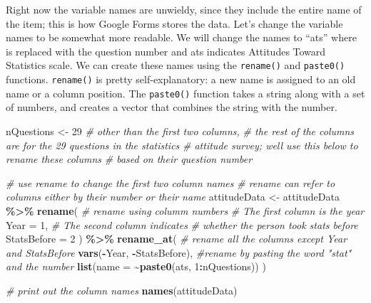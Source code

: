 \documentclass[
  12pt,
]{book}
\newenvironment{Shaded}{\begin{snugshade}}{\end{snugshade}}
\newcommand{\AttributeTok}[1]{\textcolor[rgb]{0.13,0.29,0.53}{#1}}
\newcommand{\CommentTok}[1]{\textcolor[rgb]{0.56,0.35,0.01}{\textit{#1}}}
\newcommand{\DecValTok}[1]{\textcolor[rgb]{0.00,0.00,0.81}{#1}}
\newcommand{\FunctionTok}[1]{\textcolor[rgb]{0.13,0.29,0.53}{\textbf{#1}}}
\newcommand{\NormalTok}[1]{#1}
\newcommand{\OtherTok}[1]{\textcolor[rgb]{0.56,0.35,0.01}{#1}}
\newcommand{\SpecialCharTok}[1]{\textcolor[rgb]{0.81,0.36,0.00}{\textbf{#1}}}
\newcommand{\StringTok}[1]{\textcolor[rgb]{0.31,0.60,0.02}{#1}}
\begin{document}
Right now the variable names are unwieldy, since they include the entire name of the item; this is how Google Forms stores the data. Let's change the variable names to be somewhat more readable. We will change the names to ``ats'' where is replaced with the question number and ats indicates Attitudes Toward Statistics scale. We can create these names using the \texttt{rename()} and \texttt{paste0()} functions. \texttt{rename()} is pretty self-explanatory: a new name is assigned to an old name or a column position. The \texttt{paste0()} function takes a string along with a set of numbers, and creates a vector that combines the string with the number.

\begin{Shaded}
\begin{Highlighting}[]
\NormalTok{nQuestions }\OtherTok{\textless{}{-}} \DecValTok{29} \CommentTok{\# other than the first two columns, }
\CommentTok{\# the rest of the columns are for the 29 questions in the statistics}
\CommentTok{\# attitude survey; we\textquotesingle{}ll use this below to rename these columns }
\CommentTok{\# based on their question number}

\CommentTok{\# use rename to change the first two column names}
\CommentTok{\# rename can refer to columns either by their number or their name}
\NormalTok{attitudeData }\OtherTok{\textless{}{-}}
\NormalTok{  attitudeData }\SpecialCharTok{\%\textgreater{}\%} 
  \FunctionTok{rename}\NormalTok{(     }\CommentTok{\# rename using columm numbers}
    \CommentTok{\# The first column is the year }
    \AttributeTok{Year =} \DecValTok{1}\NormalTok{, }
    \CommentTok{\# The second column indicates }
    \CommentTok{\# whether the person took stats before}
    \AttributeTok{StatsBefore =} \DecValTok{2} 
\NormalTok{  ) }\SpecialCharTok{\%\textgreater{}\%} 
  \FunctionTok{rename\_at}\NormalTok{( }
    \CommentTok{\# rename all the columns except Year and StatsBefore}
    \FunctionTok{vars}\NormalTok{(}\SpecialCharTok{{-}}\NormalTok{Year, }\SpecialCharTok{{-}}\NormalTok{StatsBefore), }
    \CommentTok{\#rename by pasting the word "stat" and the number}
    \FunctionTok{list}\NormalTok{(}\AttributeTok{name =} \SpecialCharTok{\textasciitilde{}}\FunctionTok{paste0}\NormalTok{(}\StringTok{\textquotesingle{}ats\textquotesingle{}}\NormalTok{, }\DecValTok{1}\SpecialCharTok{:}\NormalTok{nQuestions)) }
\NormalTok{  )}

\CommentTok{\# print out the column names}
\FunctionTok{names}\NormalTok{(attitudeData)}
\end{Highlighting}
\end{Shaded}
\end{document}
